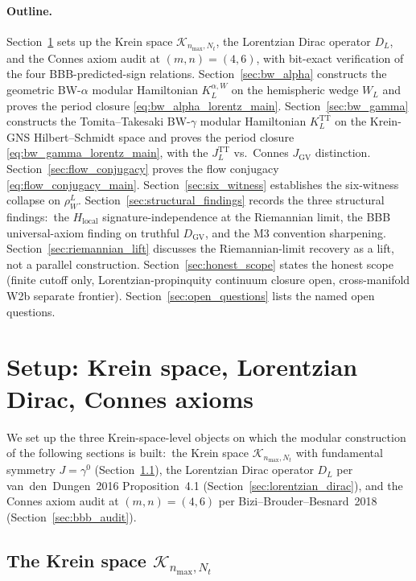 \documentclass[11pt,a4paper]{article}
\theoremstyle{plain}
\theoremstyle{definition}
\newcommand{\nmax}{n_{\max}}
\newcommand{\Nt}{N_t}
\newcommand{\Krein}{\mathcal{K}}
\newcommand{\DGV}{D_{\mathrm{GV}}}
\newcommand{\DL}{D_{L}}
\newcommand{\KL}{K_{L}}
\newcommand{\JL}{J_{L}}
\newcommand{\TT}{\mathrm{TT}}
\begin{document}
\paragraph{Outline.}
Section~\ref{sec:setup} sets up the Krein space $\Krein_{\nmax, \Nt}$,
the Lorentzian Dirac operator $\DL$, and the Connes axiom audit at
$(m, n) = (4, 6)$, with bit-exact verification of the four
BBB-predicted-sign relations.
Section~\ref{sec:bw_alpha} constructs the geometric BW-$\alpha$
modular Hamiltonian $\KL^{\alpha, W}$ on the hemispheric wedge $W_L$
and proves the period closure
\eqref{eq:bw_alpha_lorentz_main}.
Section~\ref{sec:bw_gamma} constructs the Tomita--Takesaki BW-$\gamma$
modular Hamiltonian $\KL^\TT$ on the Krein-GNS Hilbert--Schmidt space
and proves the period closure
\eqref{eq:bw_gamma_lorentz_main}, with the $\JL^\TT$ vs.\ Connes
$J_{\mathrm{GV}}$ distinction.
Section~\ref{sec:flow_conjugacy} proves the flow conjugacy
\eqref{eq:flow_conjugacy_main}.
Section~\ref{sec:six_witness} establishes the six-witness collapse on
$\rho_W^L$.
Section~\ref{sec:structural_findings} records the three structural
findings:\ the $H_{\mathrm{local}}$ signature-independence at the
Riemannian limit, the BBB universal-axiom finding on truthful $\DGV$,
and the M3 convention sharpening.
Section~\ref{sec:riemannian_lift} discusses the Riemannian-limit
recovery as a lift, not a parallel construction.
Section~\ref{sec:honest_scope} states the honest scope (finite cutoff
only, Lorentzian-propinquity continuum closure open, cross-manifold
W2b separate frontier).
Section~\ref{sec:open_questions} lists the named open questions.

\section{Setup: Krein space, Lorentzian Dirac, Connes axioms}
\label{sec:setup}

We set up the three Krein-space-level objects on which the modular
construction of the following sections is built:\ the Krein space
$\Krein_{\nmax, \Nt}$ with fundamental symmetry $J = \gamma^0$
(Section~\ref{sec:krein_space}), the Lorentzian Dirac operator
$\DL$ per van~den~Dungen~2016 Proposition~4.1
(Section~\ref{sec:lorentzian_dirac}), and the Connes axiom audit at
$(m, n) = (4, 6)$ per Bizi--Brouder--Besnard~2018
(Section~\ref{sec:bbb_audit}).

\subsection{The Krein space $\Krein_{\nmax, \Nt}$}\label{sec:krein_space}
\end{document}
